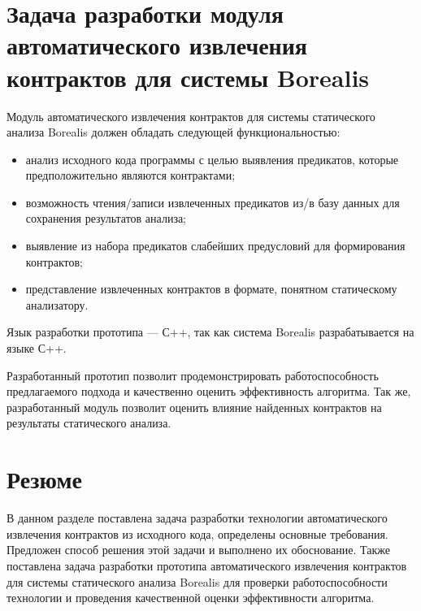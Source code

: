 \section{Задача разработки модуля автоматического извлечения контрактов для системы Borealis}
Модуль автоматического извлечения контрактов для системы статического анализа Borealis должен обладать следующей функциональностью:
\begin{itemize}
\item анализ исходного кода программы с целью выявления предикатов, которые предположительно являются контрактами;
\item возможность чтения/записи извлеченных предикатов из/в базу данных для сохранения результатов анализа;
\item выявление из набора предикатов слабейших предусловий для формирования контрактов;
\item представление извлеченных контрактов в формате, понятном статическому анализатору.
\end{itemize}
Язык разработки прототипа --- С++\cite{languageC++}, так как система Borealis разрабатывается на языке С++.

Разработанный прототип позволит продемонстрировать работоспособность предлагаемого подхода и качественно оценить эффективность алгоритма. Так же, разработанный модуль позволит оценить влияние найденных контрактов на результаты статического анализа.

\section{Резюме}
В данном разделе поставлена задача разработки технологии автоматического извлечения контрактов из исходного кода, определены основные требования. Предложен способ решения этой задачи и выполнено их обоснование. Также поставлена задача разработки прототипа автоматического извлечения контрактов для системы статического анализа Borealis для проверки работоспособности технологии и проведения качественной оценки эффективности алгоритма. 